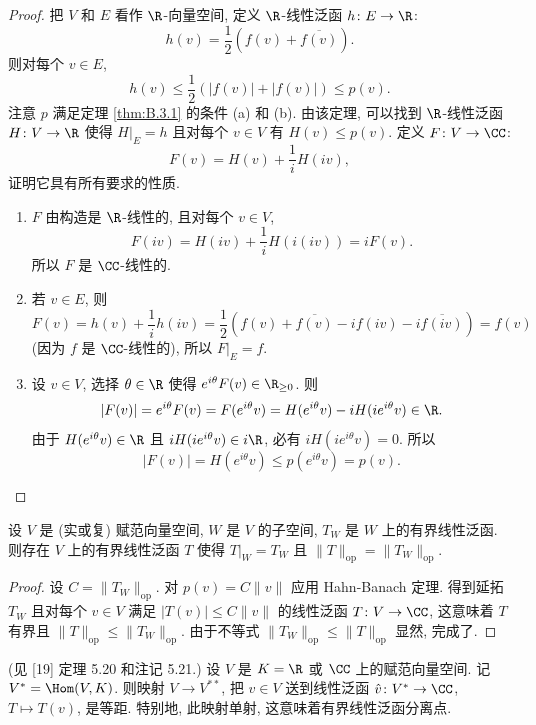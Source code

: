 \begin{proof}
把 $V$ 和 $E$ 看作 $\R$-向量空间, 定义 $\R$-线性泛函 $h \colon E \to \R$:
\[
h(v) = \frac{1}{2}(f(v) + \overline{f(v)}).
\]
则对每个 $v \in E$,
\[
h(v) \leq \frac{1}{2}(|f(v)| + |f(v)|) \leq p(v).
\]
注意 $p$ 满足定理 \ref{thm:B.3.1} 的条件 (a) 和 (b). 由该定理, 可以找到 $\R$-线性泛函 $H \colon V \to \R$ 使得 $H|_E = h$ 且对每个 $v \in V$ 有 $H(v) \leq p(v)$. 定义 $F \colon V \to \CC$:
\[
F(v) = H(v) + \frac{1}{i}H(iv),
\]
证明它具有所有要求的性质.
\begin{enumerate}
\item[(i)] $F$ 由构造是 $\R$-线性的, 且对每个 $v \in V$,
\[
F(iv) = H(iv) + \frac{1}{i}H(i(iv)) = iF(v).
\]
所以 $F$ 是 $\CC$-线性的.
\item[(ii)] 若 $v \in E$, 则
\[
F(v) = h(v) + \frac{1}{i}h(iv) = \frac{1}{2}(f(v) + \overline{f(v)} - if(iv) - i\overline{f(iv)}) = f(v)
\]
(因为 $f$ 是 $\CC$-线性的), 所以 $F|_E = f$.
\item[(iii)] 设 $v \in V$, 选择 $\theta \in \R$ 使得 $e^{i\theta}F(v) \in \R_{\geq 0}$. 则
\[
|F(v)| = e^{i\theta}F(v) = F(e^{i\theta}v) = H(e^{i\theta}v) - iH(ie^{i\theta}v) \in \R.
\]
由于 $H(e^{i\theta}v) \in \R$ 且 $iH(ie^{i\theta}v) \in i\R$, 必有 $iH(ie^{i\theta}v) = 0$. 所以
\[
|F(v)| = H(e^{i\theta}v) \leq p(e^{i\theta}v) = p(v).
\]
\end{enumerate}
\end{proof}

\begin{corollary}[保范延拓]
\label{cor:B.3.3}
设 $V$ 是 (实或复) 赋范向量空间, $W$ 是 $V$ 的子空间, $T_W$ 是 $W$ 上的有界线性泛函. 则存在 $V$ 上的有界线性泛函 $T$ 使得 $T|_W = T_W$ 且 $\|T\|_{\mathrm{op}} = \|T_W\|_{\mathrm{op}}$.
\end{corollary}

\begin{proof}
设 $C = \|T_W\|_{\mathrm{op}}$. 对 $p(v) = C\|v\|$ 应用 Hahn-Banach 定理. 得到延拓 $T_W$ 且对每个 $v \in V$ 满足 $|T(v)| \leq C\|v\|$ 的线性泛函 $T \colon V \to \CC$, 这意味着 $T$ 有界且 $\|T\|_{\mathrm{op}} \leq \|T_W\|_{\mathrm{op}}$. 由于不等式 $\|T_W\|_{\mathrm{op}} \leq \|T\|_{\mathrm{op}}$ 显然, 完成了.
\end{proof}

\begin{corollary}[双重对偶嵌入]
\label{cor:B.3.4}
(见 {[}19{]} 定理 5.20 和注记 5.21.) 设 $V$ 是 $K = \R$ 或 $\CC$ 上的赋范向量空间. 记 $V^* = \Hom(V, K)$. 则映射 $V \to V^{**}$, 把 $v \in V$ 送到线性泛函 $\hat{v} \colon V^* \to \CC$, $T \longmapsto T(v)$, 是等距.
特别地, 此映射单射, 这意味着有界线性泛函分离点.
\end{corollary}

